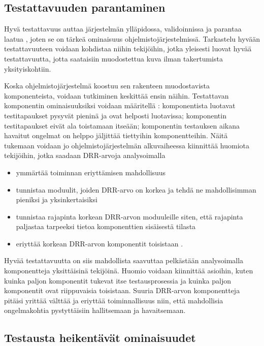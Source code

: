 \documentclass[finnish]{tktltiki2}
\numberwithin{table}{section}
\theoremstyle{definition}
\theoremstyle{remark}
\begin{document}
\subsection{Testattavuuden parantaminen}


Hyvä testattavuus auttaa järjestelmän ylläpidossa, validoinnissa ja parantaa  laatua \citep[s. 20]{Voas:1995:STN:624607.625469}, joten se on tärkeä ominaisuus ohjelmistojärjestelmissä. Tarkastelu hyvään testattavuuteen voidaan kohdistaa niihin tekijöihin, jotka yleisesti luovat hyvää testattavuutta, jotta saataisiin muodostettua kuva ilman takertumista yksityiskohtiin.


Koska ohjelmistojärjestelmä koostuu sen rakenteen muodostavista komponenteista, voidaan tutkiminen keskittää ensin näihin. Testattavan komponentin ominaisuuksiksi voidaan määritellä \citep{Freedman:1991:TSC:126218.126229}: komponentista luotavat testitapaukset pysyvät pieninä ja ovat helposti luotavissa; komponentin testitapaukset eivät ala toistamaan itseään; komponentin testauksen aikana havaitut ongelmat on helppo jäljittää tiettyihin komponentteihin. Näitä tukemaan voidaan jo ohjelmistojärjestelmän alkuvaiheessa kiinnittää huomiota tekijöihin, jotka saadaan DRR-arvoja analysoimalla \citep{voas_improving_1992} 

\begin{itemize}
	\item ymmärtää toiminnan eriyttämisen mahdollisuus
	\item tunnistaa moduulit, joiden DRR-arvo on korkea ja tehdä ne mahdollisimman pieniksi ja yksinkertaisiksi
	\item tunnistaa rajapinta korkean DRR-arvon moduuleille siten, että rajapinta paljastaa tarpeeksi tietoa komponenttien sisäisestä tilasta
	\item eriyttää korkean DRR-arvon komponentit toisistaan \citep[s. 23]{Voas:1995:STN:624607.625469}.
\end{itemize}


Hyvää testattavuutta on siis mahdollista saavuttaa pelkästään analysoimalla komponentteja yksittäisinä tekijöinä. Huomio voidaan kiinnittää asioihin, kuten kuinka paljon komponentit tukevat itse testausprosessia ja kuinka paljon komponentit ovat riippuvaisia toisistaan. Suuria DRR-arvon komponentteja pitäisi yrittää välttää ja eriyttää toiminnallisuus niin, että mahdollisia ongelmakohtia pystyttäisiin hallitsemaan ja havaitsemaan.




\subsection{Testausta heikentävät ominaisuudet}
\end{document}
